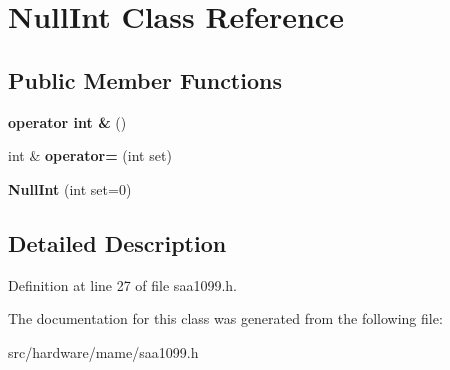 \hypertarget{classNullInt}{\section{Null\-Int Class Reference}
\label{classNullInt}
}
\subsection*{Public Member Functions}
\begin{DoxyCompactItemize}
\item 
\hypertarget{classNullInt_a71b067e744dc2f2df20e27ef70514b25}{{\bfseries operator int \&} ()}\label{classNullInt_a71b067e744dc2f2df20e27ef70514b25}

\item 
\hypertarget{classNullInt_ae42b40560b4775a9420d36d317671ae2}{int \& {\bfseries operator=} (int set)}\label{classNullInt_ae42b40560b4775a9420d36d317671ae2}

\item 
\hypertarget{classNullInt_ac5d04173da652c1a23e8cd3a46cf9f49}{{\bfseries Null\-Int} (int set=0)}\label{classNullInt_ac5d04173da652c1a23e8cd3a46cf9f49}

\end{DoxyCompactItemize}


\subsection{Detailed Description}


Definition at line 27 of file saa1099.\-h.



The documentation for this class was generated from the following file\-:\begin{DoxyCompactItemize}
\item 
src/hardware/mame/saa1099.\-h\end{DoxyCompactItemize}
